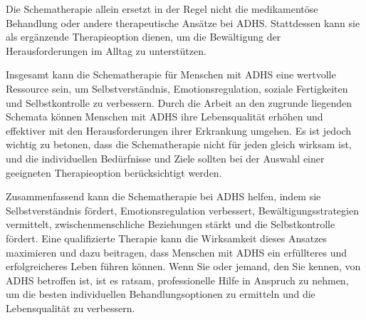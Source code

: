 Die Schematherapie allein ersetzt in der Regel nicht die medikamentöse Behandlung oder andere therapeutische Ansätze bei ADHS. Stattdessen kann sie als ergänzende Therapieoption dienen, um die Bewältigung der Herausforderungen im Alltag zu unterstützen.

Insgesamt kann die Schematherapie für Menschen mit ADHS eine wertvolle Ressource sein, um Selbstverständnis, Emotionsregulation, soziale Fertigkeiten und Selbstkontrolle zu verbessern. Durch die Arbeit an den zugrunde liegenden Schemata können Menschen mit ADHS ihre
Lebensqualität erhöhen und effektiver mit den Herausforderungen ihrer Erkrankung umgehen. Es ist jedoch wichtig zu betonen, dass die Schematherapie nicht für jeden gleich wirksam ist, und die individuellen Bedürfnisse und Ziele sollten bei der Auswahl einer geeigneten Therapieoption berücksichtigt werden.

Zusammenfassend kann die Schematherapie bei ADHS helfen, indem sie Selbstverständnis fördert, Emotionsregulation verbessert, Bewältigungsstrategien vermittelt, zwischenmenschliche Beziehungen stärkt und die Selbstkontrolle fördert. Eine qualifizierte Therapie kann die Wirksamkeit dieses Ansatzes maximieren und dazu beitragen, dass Menschen mit ADHS ein erfüllteres und erfolgreicheres Leben führen können. Wenn Sie oder jemand, den Sie kennen, von ADHS betroffen ist, ist es ratsam, professionelle Hilfe in Anspruch zu nehmen, um die besten individuellen Behandlungsoptionen zu ermitteln und die Lebensqualität zu verbessern.

